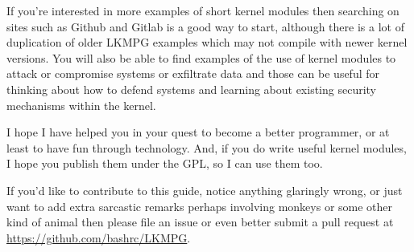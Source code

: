 \documentclass[11pt]{article}
\begin{document}
If you're interested in more examples of short kernel modules then searching on sites such as Github and Gitlab is a good way to start, although there is a lot of duplication of older LKMPG examples which may not compile with newer kernel versions. You will also be able to find examples of the use of kernel modules to attack or compromise systems or exfiltrate data and those can be useful for thinking about how to defend systems and learning about existing security mechanisms within the kernel.

I hope I have helped you in your quest to become a better programmer, or at least to have fun through technology. And, if you do write useful kernel modules, I hope you publish them under the GPL, so I can use them too.

If you'd like to contribute to this guide, notice anything glaringly wrong, or just want to add extra sarcastic remarks perhaps involving monkeys or some other kind of animal then please file an issue or even better submit a pull request at \url{https://github.com/bashrc/LKMPG}.
\end{document}
